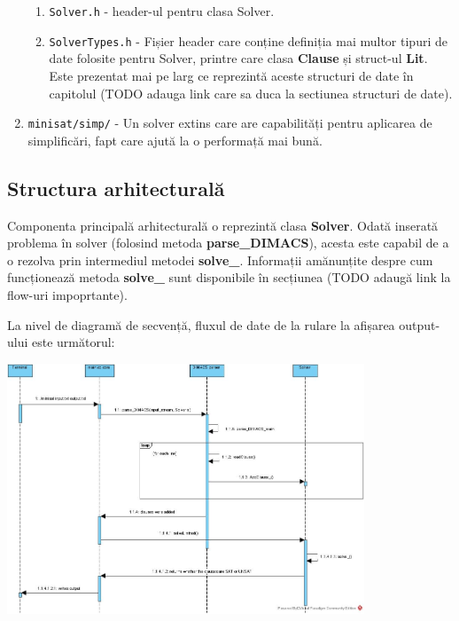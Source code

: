 \documentclass{llncs}
\begin{document}
\begin{enumerate}
\begin{enumerate}
        \item \texttt{Solver.h} - header-ul pentru clasa Solver.
        \item \texttt{SolverTypes.h} - Fișier header care conține definiția mai multor tipuri de date folosite pentru Solver, printre care clasa \textbf{Clause} și struct-ul \textbf{Lit}. Este prezentat mai pe larg ce reprezintă aceste structuri de date în capitolul (TODO adauga link care sa duca la sectiunea structuri de date).
    \end{enumerate}
    \item \texttt{minisat/simp/} - Un solver extins care are capabilități pentru aplicarea de simplificări, fapt care ajută la o performață mai bună. 
\end{enumerate}

\subsection{Structura arhitecturală}
Componenta principală arhitecturală o reprezintă clasa \textbf{Solver}. Odată inserată problema în solver (folosind metoda \textbf{parse\_DIMACS}), acesta este capabil de a o rezolva prin intermediul metodei \textbf{solve\_}. Informații amănunțite despre cum funcționează metoda \textbf{solve\_} sunt disponibile în secțiunea (TODO adaugă link la flow-uri impoprtante).

La nivel de diagramă de secvență, fluxul de date de la rulare la afișarea output-ului este următorul:

\includegraphics[width=0.8\textwidth]{resources/Minisat_main_sequence_diagram.jpg}
\end{document}
